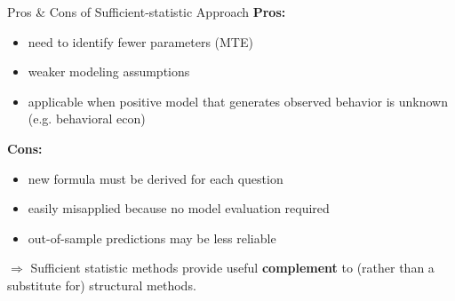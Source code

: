\documentclass{beamer}
\begin{document}
\begin{frame}{Pros \& Cons of Sufficient-statistic Approach}
	\textbf{Pros:}
	\begin{itemize}
		\item need to identify fewer parameters (MTE)
		\item weaker modeling assumptions
		\item applicable when positive model that generates observed behavior is unknown (e.g. behavioral econ)
	\end{itemize}
	\textbf{Cons:}
	\begin{itemize}
		\item new formula must be derived for each question
		\item easily misapplied because no model evaluation required
		\item out-of-sample predictions may be less reliable
	\end{itemize}
	\medskip
	$\Rightarrow$ Sufficient statistic methods provide useful \textbf{complement} to (rather than a substitute for) structural methods.
\end{frame}
\end{document}
